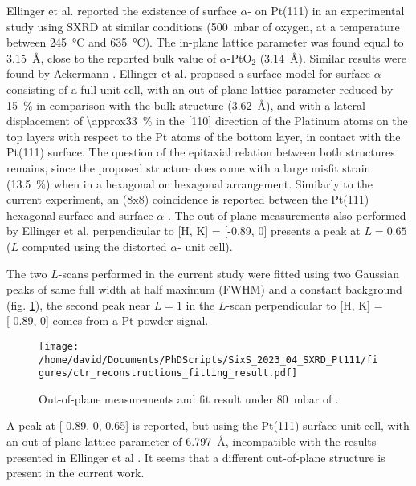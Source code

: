 Ellinger et al. \parencite*{Ellinger2008} reported the existence of surface $\alpha$- on Pt(111) in an experimental study using SXRD at similar conditions (\qty{500}{\milli\bar} of oxygen, at a temperature between \qty{245}{\degreeCelsius} and \qty{635}{\degreeCelsius}).
The in-plane lattice parameter was found equal to \qty{3.15}{\angstrom}, close to the reported bulk value of $\alpha$-PtO$_2$ (\qty{3.14}{\angstrom}).
Similar results were found by Ackermann \parencite*{Ackermann2007}.
Ellinger et al. \parencite*{Ellinger2008} proposed a surface model for surface $\alpha$- consisting of a full unit cell, with an out-of-plane lattice parameter reduced by \qty{15}{\percent} in comparison with the bulk structure (\qty{3.62}{\angstrom}), and with a lateral displacement of \qty{\approx33}{\percent} in the [110] direction of the Platinum atoms on the top layers with respect to the Pt atoms of the bottom layer, in contact with the Pt(111) surface.
The question of the epitaxial relation between both structures remains, since the proposed structure does come with a large misfit strain (\qty{13.5}{\percent}) when in a hexagonal on hexagonal arrangement.
Similarly to the current experiment, an (8x8) coincidence is reported between the Pt(111) hexagonal surface and surface $\alpha$-.
The out-of-plane measurements also performed by Ellinger et al. \parencite*{Ellinger2008} perpendicular to [H, K] = [-0.89, 0] presents a peak at $L=0.65$ ($L$ computed using the distorted $\alpha$- unit cell).

The two $L$-scans performed in the current study were fitted using two Gaussian peaks of same full width at half maximum (FWHM) and a constant background (fig. \ref{fig:LScans80Fit}), the second peak near $L=1$ in the $L$-scan perpendicular to [H, K] = [-0.89, 0] comes from a Pt powder signal.

\begin{figure}[!htb]
    \centering
    \texttt{[image: /home/david/Documents/PhDScripts/SixS\_2023\_04\_SXRD\_Pt111/figures/ctr\_reconstructions\_fitting\_result.pdf]}
    \caption{
        Out-of-plane measurements and fit result under \qty{80}{\milli\bar} of .
    }
    \label{fig:LScans80Fit}
\end{figure}

A peak at [-0.89, 0, 0.65] is reported, but using the Pt(111) surface unit cell, with an out-of-plane lattice parameter of \qty{6.797}{\angstrom}, incompatible with the results presented in Ellinger et al \parencite*{Ellinger2008}.
It seems that a different out-of-plane structure is present in the current work.

